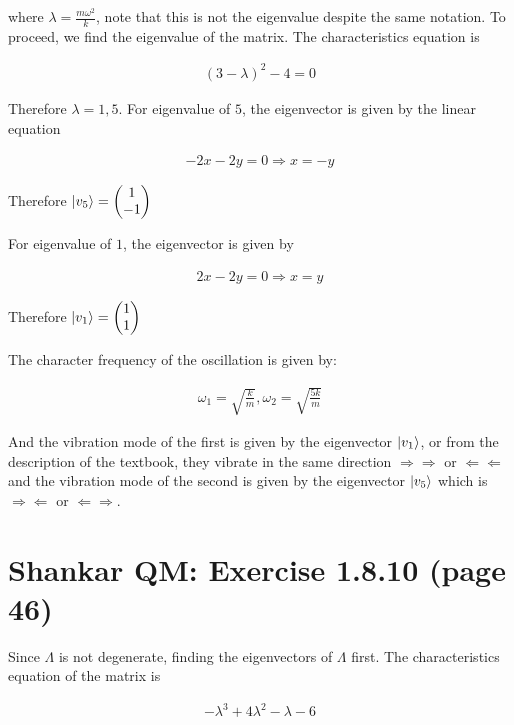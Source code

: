\documentclass{article}
\begin{document}
where $\lambda = \frac{m\omega^2}{k}$, note that this is not the eigenvalue despite the same notation. To proceed, we find the eigenvalue of the matrix. The characteristics equation is

\begin{align}
    (3-\lambda)^2 - 4 = 0
\end{align}

Therefore $\lambda = 1, 5$. For eigenvalue of $5$, the eigenvector is given by the linear equation

\begin{align}
    -2 x - 2y = 0 \Rightarrow x = -y 
\end{align}

Therefore $\ket{v_5} = \begin{pmatrix}
    1 \\ -1
\end{pmatrix}$

For eigenvalue of $1$, the eigenvector is given by

\begin{align}
    2x-2y = 0 \Rightarrow x = y
\end{align}

Therefore $\ket{v_1} = \begin{pmatrix}
    1 \\ 1
\end{pmatrix}$

The character frequency of the oscillation is given by: 

\begin{align}
    \omega_1 = \sqrt{\frac{k}{m}}, \omega_2 = \sqrt{\frac{5k}{m}}
\end{align}

And the vibration mode of the first is given by the eigenvector $\ket{v_1}$, or from the description of the textbook, they vibrate in the same direction $\Rightarrow\Rightarrow$ or $\Leftarrow \Leftarrow$ and the vibration mode of the second is given by the eigenvector $\ket{v_5}$ which is $\Rightarrow \Leftarrow$ or $\Leftarrow \Rightarrow$.

\section{Shankar QM: Exercise 1.8.10 (page 46)}

Since $\Lambda$ is not degenerate, finding the eigenvectors of $\Lambda$ first. The characteristics equation of the matrix is

\begin{align}
    -\lambda^3 + 4 \lambda^2 - \lambda - 6
\end{align}
\end{document}
